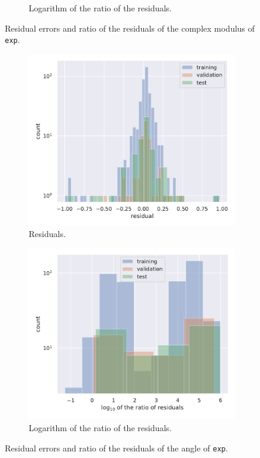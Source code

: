 \begin{figure}[htbp]
\begin{subfigure}[b]{0.45\linewidth}
    \caption{Logarithm of the ratio of the residuals.}
  \end{subfigure}
  \caption{Residual errors and ratio of the residuals of the complex modulus of \texttt{exp}.}
  \label{fig:wzw:reshist_mod}
\end{figure}

\begin{figure}[htbp]
  \centering
  \begin{subfigure}[b]{0.45\linewidth}
    \centering
    \includegraphics[width=\linewidth]{img/wzw_ann_residual_histogram_compare_angle}
    \caption{Residuals.}
  \end{subfigure}
  \begin{subfigure}[b]{0.45\linewidth}
    \centering
    \includegraphics[width=\linewidth]{img/wzw_ann_ratio_histogram_compare_angle}
    \caption{Logarithm of the ratio of the residuals.}
  \end{subfigure}
  \caption{Residual errors and ratio of the residuals of the angle of \texttt{exp}.}
  \label{fig:wzw:reshist_ang}
\end{figure}


